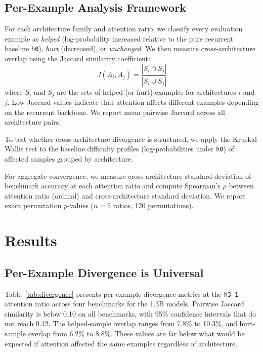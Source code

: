 \documentclass[11pt,a4paper]{article}
\begin{document}
\subsection{Per-Example Analysis Framework}
\label{sec:framework}

For each architecture family and attention ratio, we classify every evaluation example as \emph{helped} (log-probability increased relative to the pure recurrent baseline \texttt{h0}), \emph{hurt} (decreased), or \emph{unchanged}. We then measure cross-architecture overlap using the Jaccard similarity coefficient:
\begin{equation}
J(A_i, A_j) = \frac{|S_i \cap S_j|}{|S_i \cup S_j|}
\end{equation}
where $S_i$ and $S_j$ are the sets of helped (or hurt) examples for architectures $i$ and $j$. Low Jaccard values indicate that attention affects different examples depending on the recurrent backbone. We report mean pairwise Jaccard across all architecture pairs.

To test whether cross-architecture divergence is structured, we apply the Kruskal-Wallis test to the baseline difficulty profiles (log-probabilities under \texttt{h0}) of affected samples grouped by architecture.

For aggregate convergence, we measure cross-architecture standard deviation of benchmark accuracy at each attention ratio and compute Spearman's $\rho$ between attention ratio (ordinal) and cross-architecture standard deviation. We report exact permutation $p$-values ($n = 5$ ratios, 120 permutations).

\section{Results}

\subsection{Per-Example Divergence is Universal}
\label{sec:divergence}

Table~\ref{tab:divergence} presents per-example divergence metrics at the \texttt{h3-1} attention ratio across four benchmarks for the 1.3B models. Pairwise Jaccard similarity is below 0.10 on all benchmarks, with 95\% confidence intervals that do not reach 0.12. The helped-sample overlap ranges from 7.8\% to 10.3\%, and hurt-sample overlap from 6.2\% to 8.8\%. These values are far below what would be expected if attention affected the same examples regardless of architecture.
\end{document}
